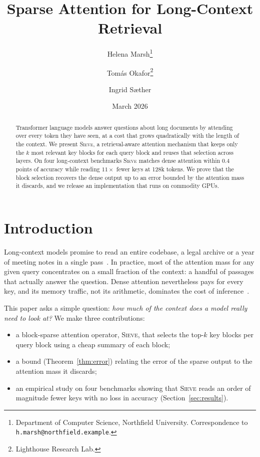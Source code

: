 \documentclass[11pt]{article}
\title{Sparse Attention for Long-Context Retrieval}
\author{%
  Helena Marsh\thanks{Department of Computer Science, Northfield University. Correspondence to \texttt{h.marsh@northfield.example}.}
  \and
  Tomás Okafor\thanks{Lighthouse Research Lab.}
  \and
  Ingrid Sæther
}
\date{March 2026}
\theoremstyle{definition}
\begin{document}
\maketitle

\begin{abstract}
Transformer language models answer questions about long documents by attending
over every token they have seen, at a cost that grows quadratically with the
length of the context. We present \textsc{Sieve}, a retrieval-aware attention
mechanism that keeps only the $k$ most relevant key blocks for each query block
and reuses that selection across layers. On four long-context benchmarks
\textsc{Sieve} matches dense attention within 0.4 points of accuracy while
reading $11\times$ fewer keys at 128k tokens. We prove that the block selection
recovers the dense output up to an error bounded by the attention mass it
discards, and we release an implementation that runs on commodity GPUs.
\end{abstract}

\tableofcontents

\section{Introduction}
\label{sec:intro}

Long-context models promise to read an entire codebase, a legal archive or a
year of meeting notes in a single pass~\citep{vaswani2017attention,beltagy2020longformer}.
In practice, most of the attention mass for any given query concentrates on a
small fraction of the context: a handful of passages that actually answer the
question. Dense attention nevertheless pays for every key, and its memory
traffic, not its arithmetic, dominates the cost of inference~\citep{dao2022flashattention}.

This paper asks a simple question: \emph{how much of the context does a model
really need to look at?} We make three contributions:
\begin{itemize}
  \item a block-sparse attention operator, \textsc{Sieve}, that selects the
        top-$k$ key blocks per query block using a cheap summary of each block;
  \item a bound (Theorem~\ref{thm:error}) relating the error of the sparse
        output to the attention mass it discards;
  \item an empirical study on four benchmarks showing that \textsc{Sieve}
        reads an order of magnitude fewer keys with no loss in accuracy
        (Section~\ref{sec:results}).
\end{itemize}
\end{document}

